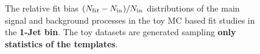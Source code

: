 \begin{figure}[!hbtp]
{} 

\caption{The relative fit bias $(N_{\text fit} - N_{\text in})/N_{\text in}$ distributions 
of the main signal and background processes in the toy MC based fit studies in the {\bf 1-Jet bin}. 
The toy datasets are generated sampling {\bf only statistics of the templates}. }
\label{fig:toyfit_statonly_1j}
\end{figure}


